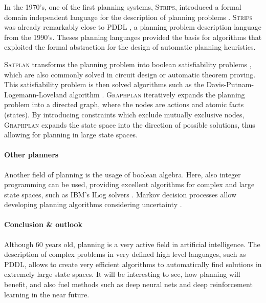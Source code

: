 \documentclass{article}
\begin{document}
In the 1970's, one of the first planning systems, \textsc{Strips}, introduced a
formal domain independent language for the description of planning problems
\cite{strips}. \textsc{Strips} was already remarkably close to 
\textsc{PDDL} \cite{pddl}, a planning problem
description language from the 1990's.
Theses planning languages provided the basis for algorithms that exploited the
formal abstraction for the design of automatic planning heuristics.  

\textsc{Satplan} transforms the planning problem into boolean satisfiability
problems \cite{satplan}, which are also commonly solved in circuit design or
automatic theorem proving. This satisfiability problem is then solved algorithms such as the
Davis-Putnam-Logemann-Loveland algorithm \cite{dpll}. \textsc{Graphplan}
iteratively expands the planning problem into a directed graph, where the nodes
are actions and atomic facts (states)\cite{graphplan}. By introducing
constraints which exclude mutually exclusive nodes, \textsc{Graphplan} expands
the state space into the direction of possible solutions, thus allowing for
planning in large state spaces.

\paragraph*{Other planners}

Another field of planning is the usage of boolean algebra. Here, also integer
programming can be used, providing excellent algorithms for complex and large
state spaces, such as IBM's ILog solvers \cite{ilog}. Markov decision processes
allow developing planning algorithms considering uncertainty \cite{mdp}. 

\paragraph*{Conclusion \& outlook}

Although 60 years old, planning is a very active field in artificial
intelligence. The description of complex problems in very defined high level
languages, such as \textsc{PDDL}, allows to create very efficient algorithms to
automatically find solutions in extremely large state spaces. It will be
interesting to see, how planning will benefit, and also fuel methods such as
deep neural nets and deep reinforcement learning in the near future.

\printbibliography
\end{document}
